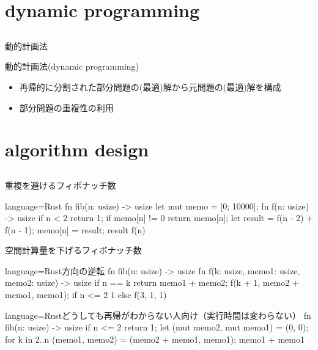 \documentclass{beamer}
\subtitle{}
\begin{document}
\begin{frame}[fragile]{}
\titlepage
\end{frame}

\section{dynamic programming}		%
\subsection{}

\begin{frame}[fragile]{動的計画法}{}
\begin{block}{動的計画法(dynamic programming)}
\begin{itemize}%
\item 再帰的に分割された部分問題の(最適)解から元問題の(最適)解を構成
\item 部分問題の重複性の利用
\end{itemize}
\end{block}

\end{frame}

\section{algorithm design}		%
\subsection{}


\begin{frame}[fragile]{重複を避ける}{フィボナッチ数}
\begin{codeof}{language=Rust}{}
fn fib(n: usize) -> usize {
    let mut memo = [0; 10000];
    fn f(n: usize) -> usize {
        if n < 2 { return 1; }
        if memo[n] != 0 { return memo[n]; }
        let result = f(n - 2) + f(n - 1);
        memo[n] = result;
        result
    }
    f(n)
}
\end{codeof}
\end{frame}

\begin{frame}[fragile]{空間計算量を下げる}{フィボナッチ数}
\begin{codeof}{language=Rust}{方向の逆転}
fn fib(n: usize) -> usize {
    fn f(k: usize, memo1: usize, memo2: usize) -> usize{
        if n == k { return memo1 + memo2; } 
        f(k + 1, memo2 + memo1, memo1);
    }
    if n <= 2 { 1 } else { f(3, 1, 1) }
}
\end{codeof}

\begin{codeof}{language=Rust}{どうしても再帰がわからない人向け（実行時間は変わらない）}
fn fib(n: usize) -> usize {
    if n <= 2 { return 1; }
    let (mut memo2, mut memo1) = (0, 0);
    for k in 2..n {
        (memo1, memo2) = (memo2 + memo1, memo1);
    }
    memo1 + memo1
}
\end{codeof}
\end{frame}
\end{document}
